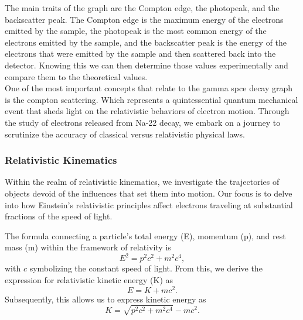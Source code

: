 \documentclass[12pt]{article}
\begin{document}
        The main traits of the graph are the Compton edge, the photopeak, and the backscatter peak. 
        The Compton edge is the maximum energy of the electrons emitted by the sample, the photopeak is the most common 
        energy of the electrons emitted by the sample, and the backscatter peak is the energy of the electrons that were emitted 
        by the sample and then scattered back into the detector. Knowing this we can then determine those values experimentally 
        and compare them to the theoretical values.
        \\ 
        
        One of the most important concepts that relate to the gamma spce decay graph is the compton scattering. Which represents a 
        quintessential quantum mechanical event that sheds light on the relativistic 
        behaviors of electron motion. Through the study of electrons released from Na-22 decay, we embark on a journey 
        to scrutinize the accuracy of classical versus relativistic physical laws.
            
        \subsubsection{Relativistic Kinematics}
                Within the realm of relativistic kinematics, we investigate the trajectories of objects devoid of 
                the influences that set them into motion. Our focus is to delve into how Einstein's relativistic 
                principles affect electrons traveling at substantial fractions of the speed of light.
                
                The formula connecting a particle's total energy (E), momentum (p), and rest mass (m) within the framework of relativity is
                \begin{equation}
                E^2 = p^2c^2 + m^2c^4,
                \end{equation}
                with \( c \) symbolizing the constant speed of light. From this, we derive the expression for relativistic kinetic energy (K) as
                \begin{equation}
                E = K + mc^2.
                \end{equation}
                Subsequently, this allows us to express kinetic energy as
                \begin{equation}
                K = \sqrt{p^2c^2 + m^2c^4} - mc^2.
                \end{equation}
\end{document}
